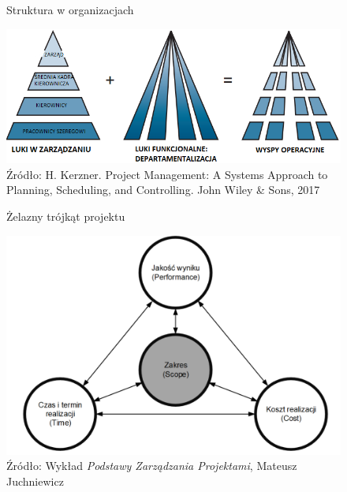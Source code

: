 \begin{figure}
\centering
\caption{Struktura w organizacjach}
\includegraphics[width=15cm]{img/organizacja_PL.png}
\caption*{Źródło:  H. Kerzner. Project Management: A Systems Approach to Planning, Scheduling, and Controlling. John
Wiley \& Sons, 2017}
\end{figure}
\begin{figure}
\centering
\caption{Żelazny trójkąt projektu}
\includegraphics[width=14cm]{img/projekt2.png}
\caption*{Źródło: Wykład \textit{Podstawy Zarządzania Projektami}, Mateusz Juchniewicz}
\end{figure}

